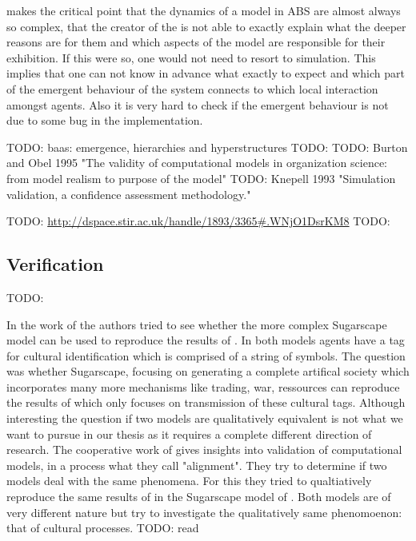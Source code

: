 \cite{galan_errors_2009} makes the critical point that the dynamics of a model in ABS are almost always so complex, that the creator of the is not able to exactly explain what the deeper reasons are for them and which aspects of the model are responsible for their exhibition. If this were so, one would not need to resort to simulation. This implies that one can not know in advance what exactly to expect and which part of the emergent behaviour of the system connects to which local interaction amongst agents. Also it is very hard to check if the emergent behaviour is not due to some bug in the implementation.









TODO: baas: emergence, hierarchies and hyperstructures
TODO: \cite{baas_emergence_1997}
TODO: Burton and Obel 1995 "The validity of computational models in organization science: from model realism to purpose of the model"
TODO: Knepell 1993 "Simulation validation, a confidence assessment methodology."

TODO: \url{http://dspace.stir.ac.uk/handle/1893/3365#.WNjO1DsrKM8}
TODO: \cite{klugl_amason:_2013}

\subsection{Verification}
TODO: \cite{axelrod_advancing_1997}

In the work of \cite{axtell_aligning_1996} the authors tried to see whether the more complex Sugarscape model can be used to reproduce the results of \cite{axelrod_convergence_1995}. In both models agents have a tag for cultural identification which is comprised of a string of symbols. The question was whether Sugarscape, focusing on generating a complete artifical society which incorporates many more mechanisms like trading, war, ressources can reproduce the results of \cite{axelrod_convergence_1995} which only focuses on transmission of these cultural tags. Although interesting the question if two models are qualitatively equivalent is not what we want to pursue in our thesis as it requires a complete different direction of research.
The cooperative work of \cite{axtell_aligning_1996} gives insights into validation of computational models, in a process what they call "alignment". They try to determine if two models deal with the same phenomena. For this they tried to qualtiatively reproduce the same results of \cite{axelrod_convergence_1995} in the Sugarscape model of \cite{epstein_growing_1996}. Both models are of very different nature but try to investigate the qualitatively same phenomoenon: that of cultural processes. TODO: read

